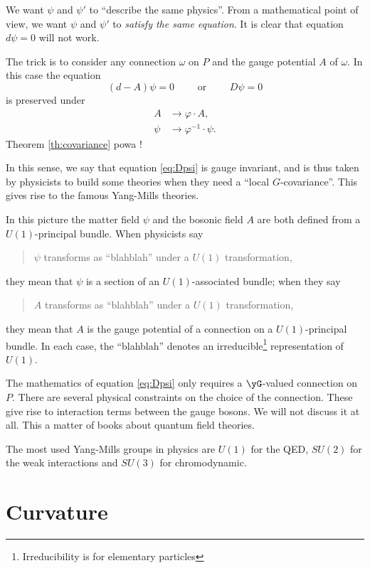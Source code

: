 We want $\psi$ and $\psi'$ to ``describe the same physics''. From a mathematical point of view, we want $\psi$ and $\psi'$ to \emph{satisfy the same equation}. It is clear that equation $d\psi=0$ will not work.

The trick is to consider any connection $\omega$ on $P$ and the gauge potential $A$ of $\omega$. In this case the equation
\begin{equation}\label{eq:Dpsi}
    (d-A)\psi=0\qquad\textrm{ or }\qquad D\psi=0
\end{equation}
is preserved under 
\[ 
 \begin{split}
A&\rightarrow\varphi\cdot A,\\
 \psi&\rightarrow\varphi^{-1}\cdot\psi.
\end{split} 
\]
 Theorem \ref{th:covariance} powa !
        
In this sense, we say that equation \eqref{eq:Dpsi} is gauge invariant, and is thus taken by physicists to build some theories when they need a ``local $G$-covariance''. This gives rise to the famous Yang-Mills theories.

In this picture the matter field $\psi$ and the bosonic field $A$ are both defined from a $U(1)$-principal bundle. When physicists say 
\begin{quote}
	$\psi$ transforms as ``blahblah'' under a $U(1)$ transformation,
\end{quote}
they mean that $\psi$ is a section of an $U(1)$-associated bundle; 
when they say
\begin{quote}
	$A$ transforms as ``blahblah'' under a $U(1)$ transformation,
\end{quote}
they mean that $A$ is the gauge potential of a connection on a $U(1)$-principal bundle. In each case, the ``blahblah'' denotes an irreducible\footnote{Irreducibility is for elementary particles} representation of $U(1)$.

\begin{remark}
The mathematics of equation \eqref{eq:Dpsi} only requires a $\yG$-valued connection on $P$. There are several physical constraints on the choice of the connection. These give rise to interaction terms between the gauge bosons. We will not discuss it at all. This a matter of books about quantum field theories.

The most used Yang-Mills groups in physics are $U(1)$ for the QED, $SU(2)$ for the weak interactions and $SU(3)$ for chromodynamic.
\end{remark}
\section{Curvature}


